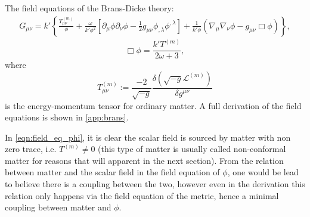 The field equations of the Brans-Dicke theory:
\begin{align}
G_{\mu\nu}=k'\left\{\frac{T_{\mu\nu}^{(m)}}{\phi}+\frac{\omega}{k'\phi^2}\left[\partial_\mu \phi \partial_\nu \phi-\frac{1}{2}g_{\mu\nu}\phi_{,\lambda}\phi^{,\lambda}\right]+\frac{1}{k'\phi}\left(\nabla_\mu\nabla_\nu\phi-g_{\mu\nu}\Box\phi\right)\right\},
\label{eqn:field_eq_metric}
\end{align}
\begin{equation}
    \Box\phi=\frac{k'T^{(m)}}{2\omega+3},
    \label{eqn:field_eq_phi}
\end{equation}
where
\begin{equation}
    T_{\mu\nu}^{(m)} := \frac{-2}{\sqrt{-g}} \frac{\delta\left(\sqrt{-g} \mathcal{L}^{(m)}\right)}{\delta g^{\mu\nu}}
    \label{eqn:def_em_tensor}
\end{equation}
is the energy-momentum tensor for ordinary matter. A full derivation of the field equations is shown in \cref{app:brans}.

In \cref{eqn:field_eq_phi}, it is clear the scalar field is sourced by matter with non zero trace, i.e. $T^{(m)}\neq 0$ (this type of matter is usually called non-conformal matter for reasons that will apparent in the next section). From the relation between matter and the scalar field in the field equation of $\phi$, one would be lead to believe there is a coupling between the two, however even in the derivation this relation only happens via the field equation of the metric, hence a minimal coupling between matter and $\phi$.

